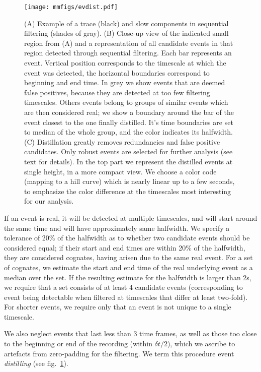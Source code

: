\documentclass[a4paper,11pt,oneside,]{article}
\begin{document}
\begin{figure}[t]

 \centering
 \texttt{[image: mmfigs/evdist.pdf]}
 \caption{(A) Example of a trace (black) and slow components in sequential filtering (shades of gray). %
 (B) Close-up view of the indicated small region from (A) and a representation of all candidate events in that region detected through sequential filtering.
 Each bar represents an event. Vertical position corresponds to the timescale at which the event was detected, the horizontal boundaries correspond to beginning and end time.
 In grey we show events that are deemed false positives, because they are detected at too few filtering timescales.
 Others events belong to groups of similar events which are then considered real; we show a boundary around the bar of the event closest to the one finally distilled. 
 It's time boundaries are set to median of the whole group, and the color indicates its halfwidth.
 (C) Distillation greatly removes redundancies and false positive candidates. Only robust events are selected for further analysis (see text for details). 
 In the top part we represent the distilled events at single height, in a more compact view.
 We choose a color code (mapping to a hill curve) which is nearly linear up to a few seconds, to emphasize the color difference at the timescales most interesting for our analysis.
 }
 \label{fig:evdist_demo}
\end{figure}



If an event is real, it will be detected at multiple timescales, and will start around the same time and will have approximately same halfwidth.
We specify a tolerance of 20\% of the halfwidth as to whether two candidate events should be considered equal; if their start and end times are within 20\% of the halfwidth, they are considered cognates, having arisen due to the same real event. 
For a set of cognates, we estimate the start and end time of the real underlying event as a median over the set.
If the resulting estimate for the halfwidth is larger than 2s, we require that a set consists of at least 4 candidate events (corresponding to event being detectable when filtered at timescales that differ at least two-fold).
For shorter events, we require only that an event is not unique to a single timescale.

We also neglect events that last less than $3$ time frames, as well as those too close to the beginning or end of the recording (within $\delta t/2$), which we ascribe to artefacts from zero-padding for the filtering. 
We term this procedure event {\it distilling} (see fig.~\ref{fig:evdist_demo}).
\end{document}
